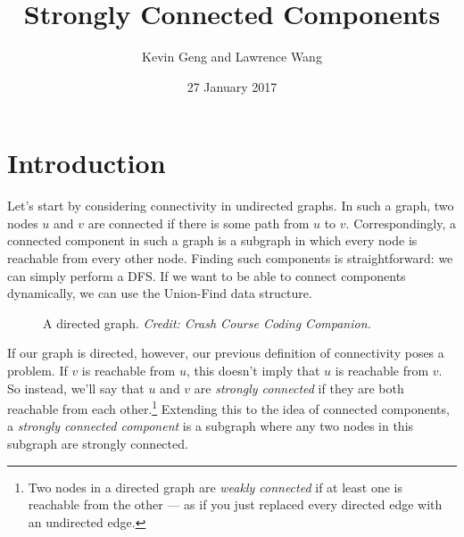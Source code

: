 \documentclass{article}
\title{Strongly Connected Components}
\author{Kevin Geng and Lawrence Wang}
\date{27 January 2017}
\begin{document}
\maketitle

\section{Introduction}

Let's start by considering connectivity in undirected graphs. In such a graph, two nodes $u$ and $v$ are connected if there is some path from $u$ to $v$. Correspondingly, a connected component in such a graph is a subgraph in which every node is reachable from every other node. Finding such components is straightforward: we can simply perform a DFS. If we want to be able to connect components dynamically, we can use the Union-Find data structure.

\begin{figure}[h]
\center
{}
\caption{A directed graph. \textit{Credit: Crash Course Coding Companion.}}
\end{figure}

If our graph is directed, however, our previous definition of connectivity poses a problem. If $v$ is reachable from $u$, this doesn't imply that $u$ is reachable from $v$. So instead, we'll say that $u$ and $v$ are \textit{strongly connected} if they are both reachable from each other.\footnote{Two nodes in a directed graph are \textit{weakly connected} if at least one is reachable from the other --- as if you just replaced every directed edge with an undirected edge.} Extending this to the idea of connected components, a \textit{strongly connected component} is a subgraph where any two nodes in this subgraph are strongly connected.
\end{document}
